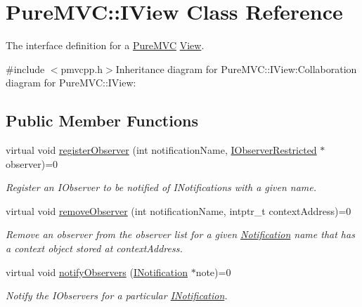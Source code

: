 \hypertarget{class_pure_m_v_c_1_1_i_view}{
\section{PureMVC::IView Class Reference}
\label{class_pure_m_v_c_1_1_i_view}
}


The interface definition for a \hyperlink{namespace_pure_m_v_c}{PureMVC} \hyperlink{class_pure_m_v_c_1_1_view}{View}.  


{\ttfamily \#include $<$pmvcpp.h$>$}Inheritance diagram for PureMVC::IView:Collaboration diagram for PureMVC::IView:\subsection*{Public Member Functions}
\begin{DoxyCompactItemize}
\item 
virtual void \hyperlink{class_pure_m_v_c_1_1_i_view_a20f6f6e91366a0efc193a70944249830}{registerObserver} (int notificationName, \hyperlink{class_pure_m_v_c_1_1_i_observer_restricted}{IObserverRestricted} $\ast$observer)=0
\begin{DoxyCompactList}\small\item\em Register an {\ttfamily IObserver} to be notified of {\ttfamily INotifications} with a given name. \item\end{DoxyCompactList}\item 
virtual void \hyperlink{class_pure_m_v_c_1_1_i_view_a0e97969101608e8486b964b3888dd0e6}{removeObserver} (int notificationName, intptr\_\-t contextAddress)=0
\begin{DoxyCompactList}\small\item\em Remove an observer from the observer list for a given \hyperlink{class_pure_m_v_c_1_1_notification}{Notification} name that has a context object stored at {\ttfamily contextAddress}. \item\end{DoxyCompactList}\item 
virtual void \hyperlink{class_pure_m_v_c_1_1_i_view_aa0123eeed26fc15fe067e3171936d143}{notifyObservers} (\hyperlink{class_pure_m_v_c_1_1_i_notification}{INotification} $\ast$note)=0
\begin{DoxyCompactList}\small\item\em Notify the {\ttfamily IObservers} for a particular {\ttfamily \hyperlink{class_pure_m_v_c_1_1_i_notification}{INotification}}. \item\end{DoxyCompactList}\item 

\end{DoxyCompactItemize}
